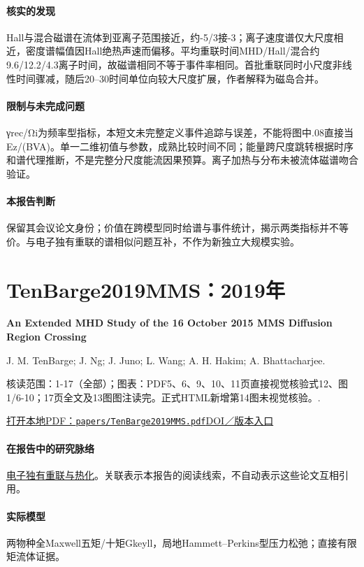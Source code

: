 \paragraph{核实的发现}Hall与混合磁谱在流体到亚离子范围接近，约-5/3接-3；离子速度谱仅大尺度相近，密度谱幅值因Hall绝热声速而偏移。平均重联时间MHD/Hall/混合约9.6/12.2/4.3离子时间，故磁谱相同不等于事件率相同。首批重联同时小尺度非线性时间骤减，随后20–30时间单位向较大尺度扩展，作者解释为磁岛合并。

\paragraph{限制与未完成问题}γrec/Ωi为频率型指标，本短文未完整定义事件追踪与误差，不能将图中.08直接当Ez/(BVA)。单一二维初值与参数，成熟比较时间不同；能量跨尺度跳转根据时序和谱代理推断，不是完整分尺度能流因果预算。离子加热与分布未被流体磁谱吻合验证。

\paragraph{本报告判断}保留其会议论文身份；价值在跨模型同时给谱与事件统计，揭示两类指标并不等价。与电子独有重联的谱相似问题互补，不作为新独立大规模实验。

\section{TenBarge2019MMS：2019年}\label{paper:TenBarge2019MMS}

\textbf{An Extended MHD Study of the 16 October 2015 MMS Diffusion Region Crossing}\citep{TenBarge2019MMS}\

J. M. TenBarge;  J. Ng;  J. Juno;  L. Wang;  A. H. Hakim;  A. Bhattacharjee.

\textsf{核读范围：}1-17（全部）；\textsf{图表：}PDF5、6、9、10、11页直接视觉核验式12、图1/6-10；17页全文及13图图注读完。正式HTML新增第14图未视觉核验。.

\href{run:papers/TenBarge2019MMS.pdf}{打开本地PDF：\texttt{papers/TenBarge2019MMS.pdf}}\quad\href{https://doi.org/10.1029/2019JA026731}{DOI／版本入口}

\paragraph{在报告中的研究脉络}\hyperref[story:energy]{电子独有重联与热化}。关联表示本报告的阅读线索，不自动表示这些论文互相引用。

\paragraph{实际模型}两物种全Maxwell五矩/十矩Gkeyll，局地Hammett–Perkins型压力松弛；直接有限矩流体证据。


